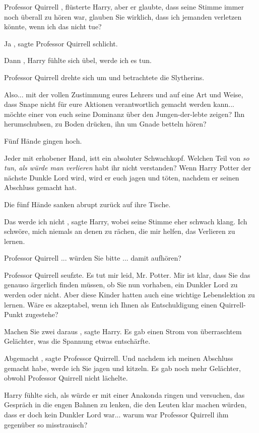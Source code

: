 \glqq Professor Quirrell\grqq{} , flüsterte Harry, aber er glaubte, dass seine
Stimme immer noch überall zu hören war, \glqq glauben Sie wirklich, dass ich
jemanden verletzen könnte, wenn ich das nicht tue?\grqq{}

\glqq Ja\grqq{} , sagte Professor Quirrell schlicht.

\glqq Dann\grqq{} , Harry fühlte sich übel, \glqq werde ich es tun.\grqq{}

Professor Quirrell drehte sich um und betrachtete die Slytherins.

\glqq Also... mit der vollen Zustimmung eures Lehrers und auf eine Art und
Weise, dass Snape nicht für eure Aktionen verantwortlich gemacht werden kann...
möchte einer von euch seine Dominanz über den Jungen-der-lebte zeigen? Ihn
herumschubsen, zu Boden drücken, ihn um Gnade betteln hören?\grqq{}

Fünf Hände gingen hoch.

\glqq Jeder mit erhobener Hand, istt ein absoluter Schwachkopf. Welchen Teil von
\emph{\glqq so tun, als würde man verlieren\grqq{} } habt ihr nicht verstanden?
Wenn Harry Potter der nächste Dunkle Lord wird, wird er euch jagen und töten,
nachdem er seinen Abschluss gemacht hat.\grqq{}

Die fünf Hände sanken abrupt zurück auf ihre Tische.

\glqq Das werde ich nicht\grqq{} , sagte Harry, wobei seine Stimme eher schwach
klang. \glqq Ich schwöre, mich niemals an denen zu rächen, die mir helfen, das
Verlieren zu lernen.

Professor Quirrell ... würden Sie bitte ... damit aufhören?\grqq{}

Professor Quirrell seufzte. \glqq Es tut mir leid, Mr. Potter. Mir ist klar,
dass Sie das genauso ärgerlich finden müssen, ob Sie nun vorhaben, ein Dunkler
Lord zu werden oder nicht. Aber diese Kinder hatten auch eine wichtige
Lebenslektion zu lernen. Wäre es akzeptabel, wenn ich Ihnen als Entschuldigung
einen Quirrell-Punkt zugestehe?\grqq{}

\glqq Machen Sie zwei daraus\grqq{} , sagte Harry. Es gab einen Strom von
überraschtem Gelächter, was die Spannung etwas entschärfte.

\glqq Abgemacht\grqq{} , sagte Professor Quirrell. \glqq Und nachdem ich meinen
Abschluss gemacht habe, werde ich Sie jagen und kitzeln.\grqq{} Es gab noch mehr
Gelächter, obwohl Professor Quirrell nicht lächelte.

Harry fühlte sich, als würde er mit einer Anakonda ringen und versuchen, das
Gespräch in die engen Bahnen zu lenken, die den Leuten klar machen würden, dass
er doch kein Dunkler Lord war... warum war Professor Quirrell ihm gegenüber so
misstrauisch?

